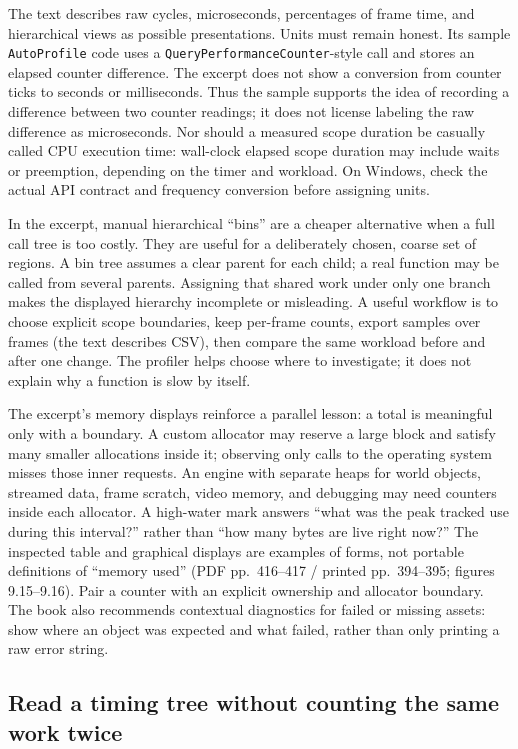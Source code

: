 The text describes raw cycles, microseconds, percentages of frame time, and hierarchical views as possible presentations. Units must remain honest. Its sample \texttt{AutoProfile} code uses a \texttt{QueryPerformanceCounter}-style call and stores an elapsed counter difference. The excerpt does not show a conversion from counter ticks to seconds or milliseconds. Thus the sample supports the idea of recording a difference between two counter readings; it does not license labeling the raw difference as microseconds. Nor should a measured scope duration be casually called CPU execution time: wall-clock elapsed scope duration may include waits or preemption, depending on the timer and workload. On Windows, check the actual API contract and frequency conversion before assigning units.

In the excerpt, manual hierarchical ``bins'' are a cheaper alternative when a full call tree is too costly. They are useful for a deliberately chosen, coarse set of regions. A bin tree assumes a clear parent for each child; a real function may be called from several parents. Assigning that shared work under only one branch makes the displayed hierarchy incomplete or misleading. A useful workflow is to choose explicit scope boundaries, keep per-frame counts, export samples over frames (the text describes CSV), then compare the same workload before and after one change. The profiler helps choose where to investigate; it does not explain why a function is slow by itself.

The excerpt's memory displays reinforce a parallel lesson: a total is meaningful only with a boundary. A custom allocator may reserve a large block and satisfy many smaller allocations inside it; observing only calls to the operating system misses those inner requests. An engine with separate heaps for world objects, streamed data, frame scratch, video memory, and debugging may need counters inside each allocator. A high-water mark answers ``what was the peak tracked use during this interval?'' rather than ``how many bytes are live right now?'' The inspected table and graphical displays are examples of forms, not portable definitions of ``memory used'' (PDF pp.~416--417 / printed pp.~394--395; figures 9.15--9.16). Pair a counter with an explicit ownership and allocator boundary. The book also recommends contextual diagnostics for failed or missing assets: show where an object was expected and what failed, rather than only printing a raw error string.

\subsection{Read a timing tree without counting the same work twice}\label{06-engine-ii-ch041-read-a-timing-tree-without-counting-the-same-work-twice}

